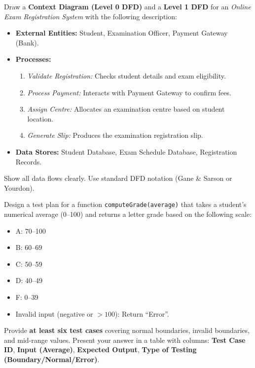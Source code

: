 \documentclass[11pt]{article}
\begin{document}
\begin{exercice}
Draw a \textbf{Context Diagram (Level 0 DFD)} and a \textbf{Level 1 DFD} for an \emph{Online Exam Registration System} with the following description:
\begin{itemize}
    \item \textbf{External Entities:} Student, Examination Officer, Payment Gateway (Bank).
    \item \textbf{Processes:}
        \begin{enumerate}
            \item \emph{Validate Registration:} Checks student details and exam eligibility.
            \item \emph{Process Payment:} Interacts with Payment Gateway to confirm fees.
            \item \emph{Assign Centre:} Allocates an examination centre based on student location.
            \item \emph{Generate Slip:} Produces the examination registration slip.
        \end{enumerate}
    \item \textbf{Data Stores:} Student Database, Exam Schedule Database, Registration Records.
\end{itemize}
Show all data flows clearly. Use standard DFD notation (Gane \& Sarson or Yourdon).
\end{exercice}

\begin{exercice}
Design a test plan for a function \texttt{computeGrade(average)} that takes a student's numerical average (0--100) and returns a letter grade based on the following scale:
\begin{itemize}
    \item A: 70--100
    \item B: 60--69
    \item C: 50--59
    \item D: 40--49
    \item F: 0--39
    \item Invalid input (negative or $>100$): Return ``Error''.
\end{itemize}
Provide \textbf{at least six test cases} covering normal boundaries, invalid boundaries, and mid-range values. Present your answer in a table with columns: \textbf{Test Case ID}, \textbf{Input (Average)}, \textbf{Expected Output}, \textbf{Type of Testing (Boundary/Normal/Error)}.
\end{exercice}
\end{document}
